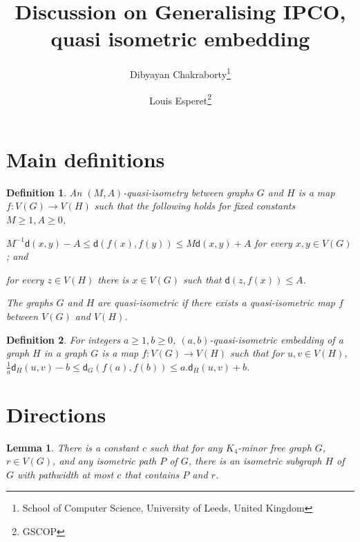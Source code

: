 \documentclass[a4paper]{article}
\title{Discussion on Generalising IPCO, quasi isometric embedding}
\author{Dibyayan Chakraborty\footnote{School of Computer Science, University of Leeds, United Kingdom}
 \and Louis Esperet\footnote{GSCOP}}
\date{}
\newcommand{\dist}[2]{\mathsf{d}\left(#1,#2\right)}
\newcommand{\distG}[3]{\mathsf{d}_{#1}\left(#2,#3\right)}
\newtheorem{lemma}{Lemma}
\newtheorem{definition}{Definition}
\begin{document}
\maketitle

\section{Main definitions}

\begin{definition}
	
	An \emph{$(M,A)$-quasi-isometry} between graphs $G$ and $H$ is a map $f\colon V(G)\rightarrow V(H)$ such that the following holds for fixed constants $M\geq 1, A\geq 0$, \begin{enumerate*}[label=(\alph*)]
		\item $M^{-1}\dist{x}{y}-A  \leq \dist{f(x)}{f(y)} \leq M\dist{x}{y}+A$ for every $x,y\in V(G)$; and \item for every $z\in V(H)$ there is $x\in V(G)$ such that $\dist{z}{f(x)}\leq A$. 
	\end{enumerate*}
	The graphs $G$ and $H$ are \emph{quasi-isometric} if there exists a quasi-isometric map $f$ between $V(G)$ and $V(H)$.
\end{definition}


 \begin{definition}
	For integers $a\geq 1,b\geq 0$, \emph{$(a,b)$-quasi-isometric embedding} of a graph $H$ in a graph $G$ is a map $f\colon V(G)\rightarrow V(H)$ such that for  $u,v \in V(H)$, $\frac{1}{a}\distG{H}{u}{v}-b\leq \distG{G}{f(a)}{f(b)} \leq a.\distG{H}{u}{v}+b$.
\end{definition}



\section{Directions}
 
 \newcommand{\quasipath}[2]{(#1,#2)\text{-quasi path}\xspace}
  \newcommand{\quasipaths}[2]{(#1,#2)\text{-quasi paths}\xspace}
  
  
  
  
 \begin{lemma}\label{lem:series-parallel}
 There is a constant $c$ such that for any $K_4$-minor free graph $G$, $r\in V(G)$, and any isometric path $P$ of $G$, there is an isometric subgraph $H$ of $G$ with  pathwidth at most $c$ that contains $P$ and $r$. 
 \end{lemma}
 
\end{document}
